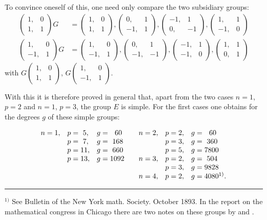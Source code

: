 To convince oneself of this, one need only compare the two
subsidiary groups:
\[
\begin{aligned}
\begin{pmatrix} 1, & 0 \\ 1, & 1 \end{pmatrix} G &=
\begin{pmatrix} 1, & 0 \\ 1, & 1 \end{pmatrix},
\begin{pmatrix} 0, & 1 \\ -1, & 1 \end{pmatrix},
\begin{pmatrix} -1, & 1 \\ 0, & -1 \end{pmatrix},
\begin{pmatrix} 1, & 1 \\ -1, & 0 \end{pmatrix} \\
\begin{pmatrix} 1, & 0 \\ -1, & 1 \end{pmatrix} G &=
\begin{pmatrix} 1, & 0 \\ -1, & 1 \end{pmatrix},
\begin{pmatrix} 0, & 1 \\ -1, & -1 \end{pmatrix},
\begin{pmatrix} -1, & 1 \\ -1, & 0 \end{pmatrix},
\begin{pmatrix} 1, & 1 \\ 0, & 1 \end{pmatrix}
\end{aligned}
\]
with $G\begin{pmatrix} 1, & 0 \\ 1, & 1 \end{pmatrix}$, $G\begin{pmatrix} 1, & 0 \\ -1, & 1 \end{pmatrix}$.

With this it is therefore proved in general that, apart from the two
cases $n=1$, $p=2$ and $n=1$, $p=3$, the group $E$
is simple. For the first cases one obtains for the degrees $g$
of these simple groups:

\[
\begin{array}{lll@{\qquad}lll}
n=1, & p=\ 5, & g=\ \ 60 & n=2, & p=2, & g=\ \ 60 \\
     & p=\ 7, & g=\ 168  &      & p=3, & g=\ 360 \\
     & p=11,  & g=\ 660  &      & p=5, & g=7800 \\
     & p=13,  & g=1092   & n=3, & p=2, & g=\ 504 \\
     &        &          &      & p=3, & g=9828 \\
     &        &          & n=4, & p=2, & g=4080^{1)}.
\end{array}
\]

\rule{4cm}{0.4pt}

$^{1)}$ See Bulletin of the New York math. Society. October 1893. In
the report on the mathematical congress in Chicago there are
two notes on these groups by  and .
